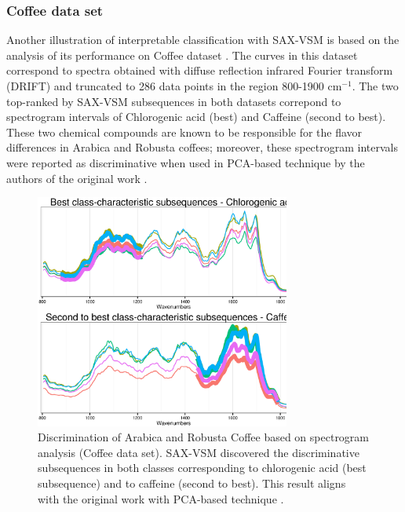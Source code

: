 \documentclass[conference]{IEEEtran}
\newcommand{\myfigureshrinker}{\vspace{0.05cm}}
\begin{document}
\subsubsection{Coffee data set}
Another illustration of interpretable classification with SAX-VSM is based on the analysis of its
performance on Coffee dataset \cite{coffee}. The curves in this dataset correspond to spectra
obtained with diffuse reflection infrared Fourier transform (DRIFT) and truncated to 286 data points
in the region 800-1900 cm$^{-1}$. The two top-ranked by SAX-VSM subsequences in both datasets
correpond to spectrogram intervals of Chlorogenic acid (best) and Caffeine (second to best).
These two chemical compounds are known to be responsible for the flavor differences in 
Arabica and Robusta coffees; moreover, these spectrogram intervals were reported 
as discriminative when used in PCA-based technique by the authors of the original work
\cite{coffee}.

\begin{figure}[t]
   \myfigureshrinker
   \centering
   \includegraphics[width=84mm]{figures/coffee_patterns.ps}
   \caption{
   Discrimination of Arabica and Robusta Coffee based on spectrogram analysis (Coffee
   data set). SAX-VSM  discovered the discriminative subsequences in both classes corresponding to chlorogenic
   acid (best subsequence) and to caffeine (second to best). This result aligns with
   the original work with PCA-based technique  \cite{coffee}.
   }
   \label{fig:coffee}
\end{figure}
\end{document}
